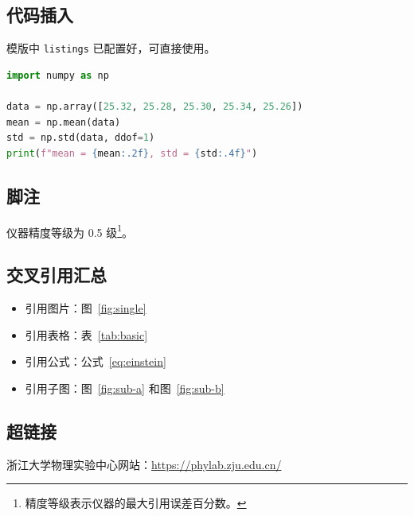 \documentclass{Phyport}
\begin{document}
\subsection{代码插入}

模版中 \texttt{listings} 已配置好，可直接使用。

\begin{lstlisting}[language=Python, caption={Python 数据处理示例}]
import numpy as np

data = np.array([25.32, 25.28, 25.30, 25.34, 25.26])
mean = np.mean(data)
std = np.std(data, ddof=1)
print(f"mean = {mean:.2f}, std = {std:.4f}")
\end{lstlisting}

\subsection{脚注}

仪器精度等级为 0.5 级\footnote{精度等级表示仪器的最大引用误差百分数。}。

\subsection{交叉引用汇总}

\begin{itemize}
    \item 引用图片：图~\ref{fig:single}
    \item 引用表格：表~\ref{tab:basic}
    \item 引用公式：公式~\eqref{eq:einstein}
    \item 引用子图：图~\ref{fig:sub-a} 和图~\ref{fig:sub-b}
\end{itemize}

\subsection{超链接}

浙江大学物理实验中心网站：\href{https://phylab.zju.edu.cn/}{https://phylab.zju.edu.cn/}
\end{document}
